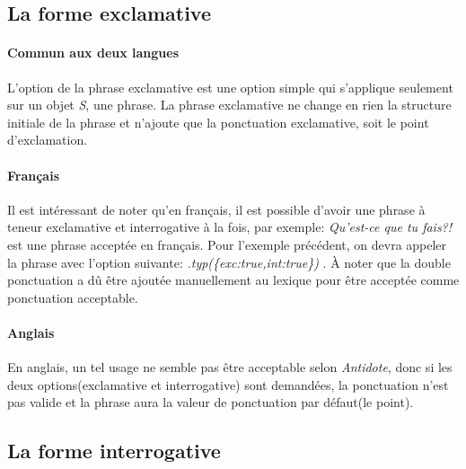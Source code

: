 \documentclass[11pt]{article} %
\begin{document}
\subsection{La forme exclamative}

\paragraph{Commun aux deux langues}

L'option de la phrase exclamative est une option simple qui s'applique
seulement sur un objet \emph{S}, une phrase. La phrase exclamative
ne change en rien la structure initiale de la phrase et n'ajoute que
la ponctuation exclamative, soit le point d'exclamation. 

\paragraph{Français}
Il est intéressant
de noter qu'en français, il est possible d'avoir une phrase à teneur
exclamative et interrogative à la fois, par exemple: \emph{Qu'est-ce
que tu fais?!} est une phrase acceptée en français. Pour
l'exemple précédent, on devra appeler la phrase avec l'option suivante:
\emph{.typ(\{exc:true,int:true\})} . À noter que la double ponctuation a dû être ajoutée
manuellement au lexique pour être acceptée comme ponctuation acceptable.

\paragraph{Anglais}
En anglais, un tel usage ne semble pas être acceptable selon \emph{Antidote},
donc si les deux options(exclamative et interrogative) sont demandées, la ponctuation n'est pas valide
et la phrase aura la valeur de ponctuation par défaut(le point).

\subsection{La forme interrogative}
\label{question}
\end{document}
